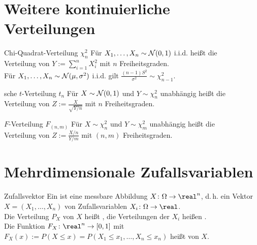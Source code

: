 \section{%
    Weitere kontinuierliche Verteilungen%
}

\begin{Def}{Chi-Quadrat-Verteilung $\chi_n^2$}
    Für $X_1, \dotsc, X_n \sim \mathcal{N}(0, 1)$ i.i.d. heißt die\\
    Verteilung von
    $Y := \sum_{i=1}^n X_i^2$ 
    mit $n$ Freiheitsgraden.\\
    Für $X_1, \dotsc, X_n \sim \mathcal{N}(\mu, \sigma^2)$ i.i.d. gilt
    $\frac{(n-1)S^2}{\sigma^2} \sim \chi_{n-1}^2$.
\end{Def}

\begin{Def}{sche $t$-Verteilung $t_n$}
    Für $X \sim \mathcal{N}(0, 1)$ und $Y \sim \chi_n^2$ unabhängig heißt die\\
    Verteilung von
    $Z := \frac{X}{\sqrt{Y/n}}$ 
    mit $n$ Freiheitsgraden.
\end{Def}

\begin{Def}{$F$-Verteilung $F_{(n,m)}$}
    Für $X \sim \chi_n^2$ und $Y \sim \chi_m^2$ unabhängig heißt die\\
    Verteilung von
    $Z := \frac{X/n}{Y/m}$ 
    mit $(n, m)$ Freiheitsgraden.
\end{Def}

\section{%
    Mehrdimensionale Zufallsvariablen%
}

\begin{Def}{Zufallsvektor}
    Ein  ist eine messbare Abbildung
    $X\colon \Omega \rightarrow \real^n$, d.\,h. ein Vektor $X = (X_1, \dotsc, X_n)$ von
    Zufallsvariablen $X_i\colon \Omega \rightarrow \real$.\\
    Die Verteilung $P_X$ von $X$ heißt ,
    die Verteilungen der $X_i$ heißen .\\
    Die Funktion $F_X\colon \real^n \rightarrow [0, 1]$ mit
    $F_X(x) := P(X \le x) = P(X_1 \le x_1, \dotsc, X_n \le x_n)$ heißt
     von $X$.
\end{Def}

